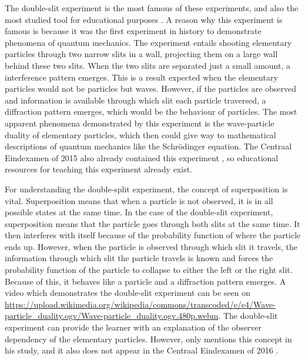 \documentclass[11pt,twoside]{report} %
\begin{document}
The double-slit experiment is the most famous of these experiments, and also the most studied tool for educational purposes \cite{asikainen, henriksen, hobson, levrini, mckagan, muller, papaphotis1,singh2, thacker}. A reason why this experiment is famous is because it was the first experiment in history to demonstrate phenomena of quantum mechanics. The experiment entails shooting elementary particles through two narrow slits in a wall, projecting them on a large wall behind these two slits. When the two slits are separated just a small amount, a interference pattern emerges. This is a result expected when the elementary particles would not be particles but waves. However, if the particles are observed and information is available through which slit each particle traversed, a diffraction pattern emerges, which would be the behaviour of particles. The most apparent phenomena demonstrated by this experiment is the wave-particle duality of elementary particles, which then could give way to mathematical descriptions of quantum mechanics like the Schrödinger equation. The Centraal Eindexamen of 2015 also already contained this experiment \cite{eindexamen2015}, so educational resources for teaching this experiment already exist.

For understanding the double-split experiment, the concept of superposition is vital. Superposition means that when a particle is not observed, it is in all possible states at the same time. In the case of the double-slit experiment, superposition means that the particle goes through both slits at the same time. It then interferes with itself because of the probability function of where the particle ends up. However, when the particle is observed through which slit it travels, the information through which slit the particle travels is known and forces the probability function of the particle to collapse to either the left or the right slit. Because of this, it behaves like a particle and a diffraction pattern emerges. A video which demonstrates the double-slit experiment can be seen on \url{https://upload.wikimedia.org/wikipedia/commons/transcoded/e/e4/Wave-particle_duality.ogv/Wave-particle_duality.ogv.480p.webm}. The double-slit experiment can provide the learner with an explanation of the observer dependency of the elementary particles. However, only  mentions this concept in his study, and it also does not appear in the Centraal Eindexamen of 2016 \cite{eindexamen2016}.
\end{document}
